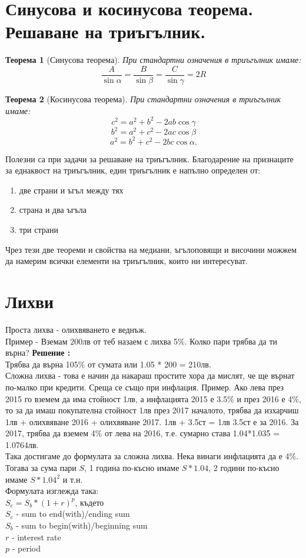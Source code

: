 \documentclass{article}
\newtheorem{theorem}{Теорема}
\newcounter{solution}
\newcommand\solution{%
	\stepcounter{solution}%
	\textbf{Решение :}\\%
}
\begin{document}
\section{Синусова и косинусова теорема. Решаване на триъгълник.}
\begin{theorem}[Синусова теорема]
	При стандартни означения в триъгълник имаме: 
	$$ \frac{A}{\sin \alpha} = \frac{B}{\sin \beta} = \frac{C}{\sin \gamma} = 2R $$
\end{theorem}

\begin{theorem}[Косинусова теорема]
	При стандартни означения в триъгълник имаме: 
	$$ c^2 = a^2 + b^2 - 2ab \cos \gamma  $$
	$$ b^2 = a^2 + c^2 - 2ac \cos \beta  $$
	$$ a^2 = b^2 + c^2 - 2bc \cos \alpha.  $$
\end{theorem}
Полезни са при задачи за решаване на триъгълник. Благодарение на признаците за еднаквост на триъгълник, един триъгълник е напълно определен от:
\begin{enumerate}
	\item две страни и ъгъл между тях
	\item страна и два ъгъла
	\item три страни
\end{enumerate}
Чрез тези две теореми и свойства на медиани, ъгълоповящи и височини можжем да намерим всички елементи на триъгълник, които ни интересуват.

\section{Лихви}
Проста лихва - олихвяването е веднъж. \\
Пример - Вземам 200лв  от теб назаем с лихва 5\%. Колко пари трябва да ти върна?
\solution
Трябва да върна 105\% от сумата или 1.05 * 200 = 210лв. \\
Сложна  лихва - това е начин да накараш простите хора да мислят, че ще върнат по-малко при кредити. Среща се също при инфлация.
Пример. Ако лева през 2015 го вземем да има стойност 1лв, а инфлацията 2015 е 3.5\% и през 2016 е 4\%, то за да имаш покупателна стойност 1лв през 2017 началото, трябва да изхарчиш 1лв + олихвяване 2016 + олихвяване 2017. 1лв + 3.5ст = 1лв 3.5ст е за 2016. За 2017, трябва да вземем 4\% от лева на 2016, т.е. сумарно става 1.04*1.035 = 1.0764лв. \\
Така достигаме до формулата за сложна лихва. Нека винаги инфлацията да е 4\%. Тогава за сума пари $S$, 1 година по-късно имаме $S*1.04$, 2 години по-късно имаме $S*1.04^2$ и т.н. \\
Формулата изглежда така: \\ $S_e = S_b*(1+r)^p $, където\\
$S_e$ - sum to end(with)/ending sum \\
$S_b$ -  sum to begin(with)/beginning sum\\
$r$ - interest rate \\
$p$ - period \\
\end{document}

